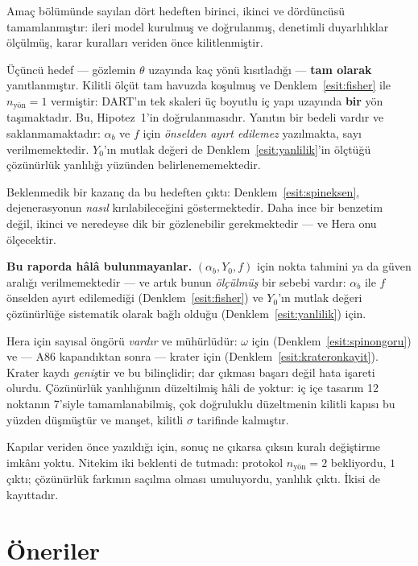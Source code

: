 \documentclass[12pt,a4paper]{article}
\begin{document}
Amaç bölümünde sayılan dört hedeften birinci, ikinci ve dördüncüsü
tamamlanmıştır: ileri model kurulmuş ve doğrulanmış, denetimli
duyarlılıklar ölçülmüş, karar kuralları veriden önce kilitlenmiştir.

Üçüncü hedef --- gözlemin $\theta$ uzayında kaç yönü kısıtladığı ---
\textbf{tam olarak} yanıtlanmıştır. Kilitli ölçüt tam havuzda koşulmuş
ve Denklem~\eqref{esit:fisher} ile $n_{\text{yön}} = 1$ vermiştir: DART'ın
tek skaleri üç boyutlu iç yapı uzayında \textbf{bir} yön taşımaktadır.
Bu, Hipotez~1'in doğrulanmasıdır. Yanıtın bir bedeli vardır ve
saklanmamaktadır: $\alpha_b$ ve $f$ için \emph{önselden ayırt edilemez}
yazılmakta, sayı verilmemektedir. $Y_0$'ın mutlak değeri de Denklem~\eqref{esit:yanlilik}'in
ölçtüğü çözünürlük yanlılığı yüzünden belirlenememektedir.

Beklenmedik bir kazanç da bu hedeften çıktı:
Denklem~\eqref{esit:spineksen}, dejenerasyonun \emph{nasıl}
kırılabileceğini göstermektedir. Daha ince bir benzetim değil, ikinci ve
neredeyse dik bir gözlenebilir gerekmektedir --- ve Hera onu ölçecektir.

\begin{bekleyen}
\textbf{Bu raporda hâlâ bulunmayanlar.} $(\alpha_b, Y_0, f)$ için
nokta tahmini ya da güven aralığı verilmemektedir --- ve artık bunun
\emph{ölçülmüş} bir sebebi vardır: $\alpha_b$ ile $f$ önselden ayırt
edilemediği (Denklem~\eqref{esit:fisher}) ve $Y_0$'ın mutlak değeri
çözünürlüğe sistematik olarak bağlı olduğu
(Denklem~\eqref{esit:yanlilik}) için.

Hera için sayısal öngörü \emph{vardır} ve mühürlüdür: $\omega$
için (Denklem~\eqref{esit:spinongoru}) ve --- A86 kapandıktan sonra ---
krater için (Denklem~\eqref{esit:krateronkayit}). Krater kaydı
\emph{geniş}tir ve bu bilinçlidir; dar çıkması başarı değil hata
işareti olurdu. Çözünürlük yanlılığının
düzeltilmiş hâli de yoktur: iç içe tasarım 12 noktanın 7'siyle
tamamlanabilmiş, çok doğruluklu düzeltmenin kilitli kapısı bu
yüzden düşmüştür ve manşet, kilitli $\sigma$ tarifinde kalmıştır.

Kapılar veriden önce yazıldığı için, sonuç ne çıkarsa çıksın kuralı
değiştirme imkânı yoktu. Nitekim iki beklenti de tutmadı: protokol
$n_{\text{yön}}=2$ bekliyordu, $1$ çıktı; çözünürlük farkının
saçılma olması umuluyordu, yanlılık çıktı. İkisi de kayıttadır.
\end{bekleyen}

\section{Öneriler}
\end{document}
